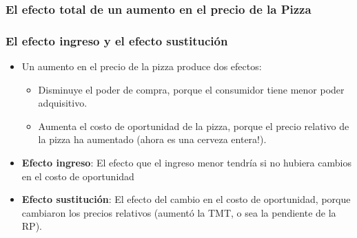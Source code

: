 \documentclass{beamer}
\begin{document}
\begin{frame}
\frametitle{El efecto total de un aumento en el precio de la Pizza} 
\begin{center}
\begin{figure}[H]
\renewcommand{\figurename}{Figure}
\begin{center}
\end{center}
\end{figure}
\end{center}
\end{frame}

\begin{frame}
\frametitle{El efecto ingreso y el efecto sustitución}
\begin{itemize}
    \item Un aumento en el precio de la pizza produce dos efectos:
    \begin{itemize}
        \item Disminuye el poder de compra, porque el consumidor tiene menor poder adquisitivo.
        \item Aumenta el costo de oportunidad de la pizza, porque el precio relativo de la pizza ha aumentado (ahora es una cerveza entera!).
    \end{itemize}
    \item \textbf{Efecto ingreso}: El efecto que el ingreso menor tendría si no hubiera cambios en el costo de oportunidad
    \item \textbf{Efecto sustitución}: El efecto del cambio en el costo de oportunidad, porque cambiaron los precios relativos (aumentó la TMT, o sea la pendiente de la RP).
\end{itemize} 
\end{frame}
\end{document}
